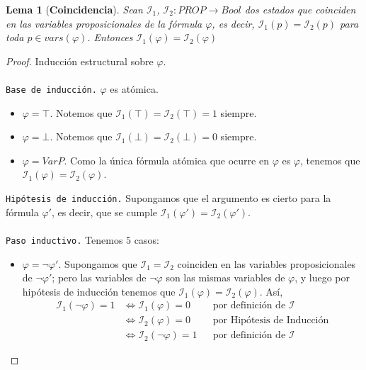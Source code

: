 \documentclass[letterpaper,12pt]{article}
\newtheorem{lema}{Lema}[]
\begin{document}
    \newpage
    \begin{lema} [\textbf{Coincidencia}]
        Sean $\mathcal{I}_{1}$, $\mathcal{I}_{2} : PROP \rightarrow Bool$ dos
        estados que coinciden en las variables proposicionales de la fórmula 
        $\varphi$, es decir, $\mathcal{I}_{1}(p) = \mathcal{I}_{2}(p)$ para 
        toda $p \in vars(\varphi)$. Entonces 
        $\mathcal{I}_{1}(\varphi) = \mathcal{I}_{2}(\varphi)$
    \end{lema}
    \begin{proof}
        Inducción estructural sobre $\varphi$.\\ \\
        \texttt{Base de inducción.} $\varphi$ es atómica.
        \begin{itemize}
            \item $\varphi = \top$. Notemos que 
            $\mathcal{I}_{1}(\top) = \mathcal{I}_{2}(\top) = 1$ siempre.
            \item $\varphi = \bot$. Notemos que 
            $\mathcal{I}_{1}(\bot) = \mathcal{I}_{2}(\bot) = 0$ siempre.
            \item $\varphi = VarP$. Como la única fórmula atómica que ocurre
            en $\varphi$ es $\varphi$, tenemos que 
            $\mathcal{I}_{1}(\varphi) = \mathcal{I}_{2}(\varphi)$.
        \end{itemize}

        \justify
        \texttt{Hipótesis de inducción.} Supongamos que el argumento es cierto
        para la fórmula $\varphi '$, es decir, que se cumple 
        $\mathcal{I}_{1}(\varphi ') = \mathcal{I}_{2}(\varphi ')$. \\ \\
        \texttt{Paso inductivo.} Tenemos $5$ casos:
        \begin{itemize}
            \item $\varphi = \neg \varphi '$. Supongamos que 
            $\mathcal{I}_{1} = \mathcal{I}_{2}$ coinciden en las variables
            proposicionales de $\neg \varphi '$; pero las variables de 
            $\neg \varphi$ son las mismas variables de $\varphi$, y luego 
            por hipótesis de inducción tenemos que 
            $\mathcal{I}_{1}(\varphi) = \mathcal{I}_{2}(\varphi)$. Así, 
            \begin{align*}
                \mathcal{I}_{1}(\neg \varphi) = 1 
                &\Leftrightarrow \mathcal{I}_{1}(\varphi) = 0
                && \text{por definición de $\mathcal{I}$} \\
                &\Leftrightarrow \mathcal{I}_{2}(\varphi) = 0
                && \text{por Hipótesis de Inducción} \\
                &\Leftrightarrow \mathcal{I}_{2}(\neg \varphi) = 1
                && \text{por definición de $\mathcal{I}$}
            \end{align*}


\end{itemize}
\end{proof}
\end{document}
